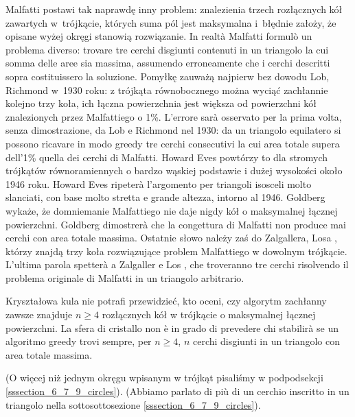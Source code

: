 Malfatti postawi tak naprawdę inny problem: znalezienia trzech rozłącznych kół zawartych w~trójkącie, których suma pól jest maksymalna i~błędnie założy, że opisane wyżej okręgi stanowią rozwiązanie. %
In realtà Malfatti formulò un problema diverso: trovare tre cerchi disgiunti contenuti in un triangolo la cui somma delle aree sia massima, assumendo erroneamente che i cerchi descritti sopra costituissero la soluzione. %
Pomyłkę zauważą najpierw bez dowodu Lob, Richmond \cite{lob_richmond_1930} w~1930 roku: z trójkąta równobocznego można wyciąć zachłannie kolejno trzy koła, ich łączna powierzchnia jest większa od powierzchni kół znalezionych przez Malfattiego o 1\%. %
L'errore sarà osservato per la prima volta, senza dimostrazione, da Lob e Richmond \cite{lob_richmond_1930} nel 1930: da un triangolo equilatero si possono ricavare in modo greedy tre cerchi consecutivi la cui area totale supera dell'1\% quella dei cerchi di Malfatti. %
%
%
Howard Eves powtórzy to dla stromych trójkątów równoramiennych o bardzo wąskiej podstawie i dużej wysokości około 1946 roku. %
Howard Eves ripeterà l'argomento per triangoli isosceli molto slanciati, con base molto stretta e grande altezza, intorno al 1946. %
%
Goldberg \cite{goldberg_1967} wykaże, że domniemanie Malfattiego nie daje nigdy kół o maksymalnej łącznej powierzchni. %
Goldberg \cite{goldberg_1967} dimostrerà che la congettura di Malfatti non produce mai cerchi con area totale massima. %
Ostatnie słowo należy zaś do Zalgallera, Losa \cite{zalgaller_los_1992}, którzy znajdą trzy koła rozwiązujące problem Malfattiego w dowolnym trójkącie. %
L'ultima parola spetterà a Zalgaller e Los \cite{zalgaller_los_1992}, che troveranno tre cerchi risolvendo il problema originale di Malfatti in un triangolo arbitrario. %
%
%

Kryształowa kula nie potrafi przewidzieć, kto oceni, czy algorytm zachłanny zawsze znajduje $n \ge 4$ rozłącznych kół w trójkącie o maksymalnej łącznej powierzchni. %
La sfera di cristallo non è in grado di prevedere chi stabilirà se un algoritmo greedy trovi sempre, per $n \ge 4$, $n$ cerchi disgiunti in un triangolo con area totale massima. %

(O więcej niż jednym okręgu wpisanym w trójkąt pisaliśmy w podpodsekcji \ref{sssection_6_7_9_circles}). %
(Abbiamo parlato di più di un cerchio inscritto in un triangolo nella sottosottosezione \ref{sssection_6_7_9_circles}). %

%